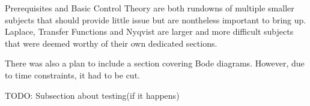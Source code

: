 Prerequisites and Basic Control Theory are both rundowns of multiple smaller subjects that should provide little issue but are nontheless important to bring up. Laplace, Transfer Functions and Nyqvist are larger and more difficult subjects that were deemed worthy of their own dedicated sections.

There was also a plan to include a section covering Bode diagrams. However, due to time constraints, it had to be cut.

TODO: Subsection about testing(if it happens)

